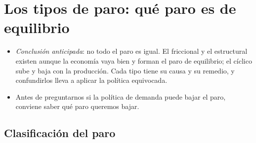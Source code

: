 \documentclass[11pt]{article}
\begin{document}
\section{Los tipos de paro: qué paro es de equilibrio}\label{sec:tipos-paro}

\begin{itemize}
\item \emph{Conclusión anticipada}: no todo el paro es igual. El friccional y el estructural existen aunque la economía vaya bien y forman el paro de equilibrio; el cíclico sube y baja con la producción. Cada tipo tiene su causa y su remedio, y confundirlos lleva a aplicar la política equivocada.
\item Antes de preguntarnos si la política de demanda puede bajar el paro, conviene saber qué paro queremos bajar.
\end{itemize}

\subsection{Clasificación del paro}\label{sec:clasificacion}
\end{document}
